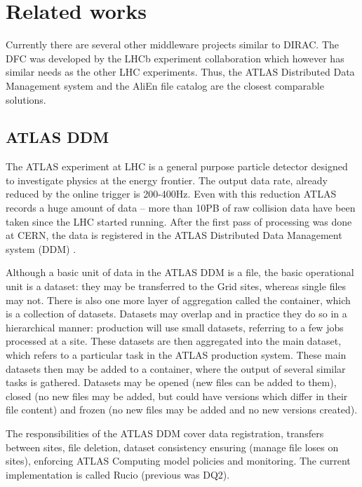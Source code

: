 \chapter{Related works}
\label{chap:relwork}

Currently there are several other middleware projects similar to DIRAC. The DFC was developed by the LHCb experiment 
collaboration which however has similar needs as the other LHC experiments. Thus, the ATLAS
Distributed Data Management system and the AliEn file catalog are the closest comparable solutions.


\section{ATLAS DDM}
The ATLAS experiment at LHC is a general purpose particle detector designed to investigate physics at the energy
frontier. The output data rate, already reduced by the online trigger is  200-400Hz. Even with this reduction 
ATLAS records a huge amount of data – more than 10PB of raw collision data have been taken since the LHC
started running. After the first pass of processing was done at CERN, the data is registered in the ATLAS 
Distributed Data Management system (DDM) \cite{ATLASDDM1}.

Although a basic unit of data in the ATLAS DDM is a file, the basic operational unit is a dataset: they may be
transferred to the Grid sites, whereas single files may not. There is also one more layer of aggregation called the 
container, which is a collection of datasets. Datasets may overlap and in practice they do so in a 
hierarchical manner: production will use small datasets, referring to a few jobs processed at a site. These datasets
are then aggregated into the main dataset, which refers to a particular task in the ATLAS
production system. These main datasets then may be added to a container, where the output of several 
similar tasks is gathered. Datasets may be opened (new files can be added to them), closed (no new files
may be added, but could have versions which differ in their file content) and frozen (no new files may be added and 
no new versions created). 

The responsibilities of the ATLAS DDM cover data registration, transfers between sites, file deletion, dataset 
consistency ensuring (manage file loses on sites), enforcing ATLAS Computing model policies and monitoring. The
current implementation is called Rucio (previous was DQ2).



